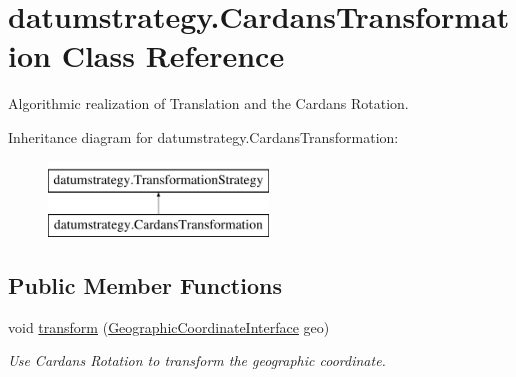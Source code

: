 \hypertarget{classdatumstrategy_1_1_cardans_transformation}{}\section{datumstrategy.\+Cardans\+Transformation Class Reference}
\label{classdatumstrategy_1_1_cardans_transformation}


Algorithmic realization of Translation and the Cardan\textquotesingle{}s Rotation.  


Inheritance diagram for datumstrategy.\+Cardans\+Transformation\+:\begin{figure}[H]
\begin{center}
\leavevmode
\includegraphics[height=2.000000cm]{classdatumstrategy_1_1_cardans_transformation}
\end{center}
\end{figure}
\subsection*{Public Member Functions}
\begin{DoxyCompactItemize}
\item 
void \hyperlink{classdatumstrategy_1_1_cardans_transformation_addccd1b729d860e578cd11154d8f63e2}{transform} (\hyperlink{classcoordinates_1_1_geographic_coordinate_interface}{Geographic\+Coordinate\+Interface} geo)
\begin{DoxyCompactList}\small\item\em Use Cardan\textquotesingle{}s Rotation to transform the geographic coordinate. \end{DoxyCompactList}\end{DoxyCompactItemize}
